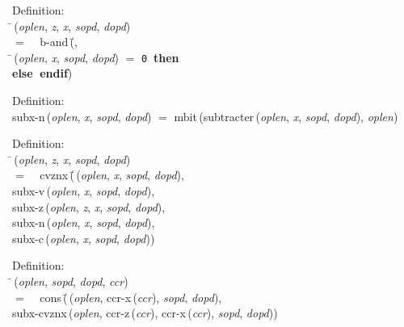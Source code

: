 \begin{tabbing}{\sc Definition}: \\  
\=\,({\it{oplen\/}}, {\it{z\/}}, {\it{x\/}}, {\it{sopd\/}}, {\it{dopd\/}}) \\ 
$=$$\;\;\;\;${\rm{b-and}}\,(\=, \\ 
\=\,({\it{oplen\/}}, {\it{x\/}}, {\it{sopd\/}}, {\it{dopd\/}}) $=$ {\tt{0}}$\;\;${\bf then }{} \\ 
{\bf else }{}$\;${\bf  endif}\-)\-\-
\end{tabbing}

\begin{tabbing}{\sc Definition}: \\  
{\rm{subx-n}}\,({\it{oplen\/}}, {\it{x\/}}, {\it{sopd\/}}, {\it{dopd\/}}) $=$ {\rm{mbit}}\,({\rm{subtracter}}\,({\it{oplen\/}}, {\it{x\/}}, {\it{sopd\/}}, {\it{dopd\/}}), {\it{oplen\/}})
\end{tabbing}

\begin{tabbing}{\sc Definition}: \\  
\=\,({\it{oplen\/}}, {\it{z\/}}, {\it{x\/}}, {\it{sopd\/}}, {\it{dopd\/}}) \\ 
$=$$\;\;\;\;${\rm{cvznx}}\,(\=\,({\it{oplen\/}}, {\it{x\/}}, {\it{sopd\/}}, {\it{dopd\/}}), \\ 
{\rm{subx-v}}\,({\it{oplen\/}}, {\it{x\/}}, {\it{sopd\/}}, {\it{dopd\/}}), \\ 
{\rm{subx-z}}\,({\it{oplen\/}}, {\it{z\/}}, {\it{x\/}}, {\it{sopd\/}}, {\it{dopd\/}}), \\ 
{\rm{subx-n}}\,({\it{oplen\/}}, {\it{x\/}}, {\it{sopd\/}}, {\it{dopd\/}}), \\ 
{\rm{subx-c}}\,({\it{oplen\/}}, {\it{x\/}}, {\it{sopd\/}}, {\it{dopd\/}}))\-\-
\end{tabbing}

\begin{tabbing}{\sc Definition}: \\  
\=\,({\it{oplen\/}}, {\it{sopd\/}}, {\it{dopd\/}}, {\it{ccr\/}}) \\ 
$=$$\;\;\;\;${\rm{cons}}\,(\=\,({\it{oplen\/}}, {\rm{ccr-x}}\,({\it{ccr\/}}), {\it{sopd\/}}, {\it{dopd\/}}), \\ 
{\rm{subx-cvznx}}\,({\it{oplen\/}}, {\rm{ccr-z}}\,({\it{ccr\/}}), {\rm{ccr-x}}\,({\it{ccr\/}}), {\it{sopd\/}}, {\it{dopd\/}}))\-\-
\end{tabbing}
 
